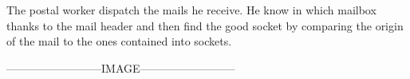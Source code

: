 \documentclass[a4paper,10pt]{article}
\begin{document}
The postal worker dispatch the mails he receive. He know in which mailbox thanks to the mail header and then find the good socket by comparing the origin of the mail to the ones contained into sockets.

--------------------------IMAGE--------------------------
\end{document}

